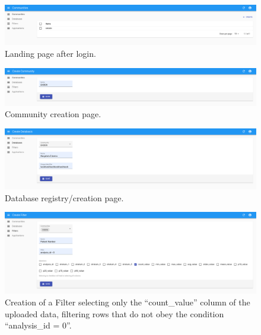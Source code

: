 \documentclass[11pt,a4paper,openright,twoside,onecolumn]{memoir}
\begin{document}
\begin{figure}[H]
    \center
    \includegraphics[width=\textwidth]{figs/admin-portal/landing-page}
    \caption{Landing page after login.}
\end{figure}

\begin{figure}[H]
    \center
    \includegraphics[width=\textwidth]{figs/admin-portal/community-creation}
    \caption{Community creation page.}
    \label{fig:admin-portal/community-creation}
\end{figure}

\begin{figure}[H]
    \center
    \includegraphics[width=\textwidth]{figs/admin-portal/database-creation}
    \caption{Database registry/creation page.}
    \label{fig:admin-portal/database-creation}
\end{figure}

\begin{figure}[H]
    \center
    \includegraphics[width=\textwidth]{figs/admin-portal/filter-creation-patient-count}
    \caption{Creation of a Filter selecting only the ``count\_value'' column of the uploaded data, filtering rows that do not obey the condition ``analysis\_id = 0''.}
    \label{fig:admin-portal/filter-creation-patient-count}
\end{figure}
\end{document}
